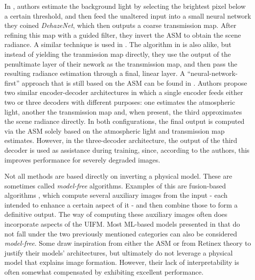 \documentclass[twocolumn,twoside,a4paper,10pt]{IEEEtran}
\begin{document}
In \cite{7539399}, authors estimate the background light by selecting the brightest pixel below a certain threshold, and then feed the unaltered input into a small neural network they coined \textit{DehazeNet}, which then outputs a coarse transmission map. After refining this map with a guided filter, they invert the ASM to obtain the scene radiance. A similar technique
is used in \cite{8450630}.
The algorithm in \cite{9190777} is also alike, but instead of yielding the tranmission map directly, they use the output
of the penultimate layer of their nework as the transmission map, and then pass
the resulting radiance estimation through a final, linear layer. A ``neural-network-first'' approach that is still based on the ASM can be found in 
\cite{guo2019dense}. Authors propose two similar encoder-decoder architectures in which a single encoder feeds either two or three decoders with different purposes: one estimates the atmospheric light, another the transmission map and,
when present, the third approximates the scene radiance directly. In both configurations,
the final output is computed via the ASM solely based on the atmospheric light
and transmission map estimates. However, in the three-decoder architecture, the
output of the third decoder is used as assistance during training, since, according to the authors, this
improves performance for severely degraded images.

Not all methods are based directly on inverting a physical model. These are sometimes called \textit{model-free} algorithms. Examples of this are fusion-based algorithms \cite{6247661,ancuti2017color}, which compute several auxiliary
images from the input - each intended to enhance a certain aspect of it - and then combine those to form a definitive output. The way of computing these auxiliary images often does incorporate aspects of the UIFM. Most ML-based
models presented in \cite{10.1145/3576918} that do not fall under the two previously mentioned categories can also be considered \textit{model-free}. Some draw inspiration from either the ASM \cite{Li_2017_ICCV} or 
from Retinex theory \cite{9274531} to justify their models' architectures, but 
ultimately do not leverage a physical model that explains image formation. 
However, their lack
of interpretability is often somewhat compensated by exhibiting excellent performance.
\end{document}
